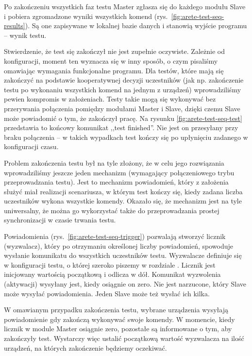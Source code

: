 \documentclass[00-praca-magisterska.tex]{subfiles}
\begin{document}
Po zakończeniu wszystkich faz testu Master zgłasza się do każdego modułu Slave
i pobiera zgromadzone wyniki wszystkich komend
(rys.~\ref{fig:arete-test-seq-results}). Są one zapisywane w lokalnej bazie
danych i stanowią wyjście programu -- wynik testu.

Stwierdzenie, że test się zakończył nie jest zupełnie oczywiste. Zależnie od
konfiguracji, moment ten wyznacza się w inny sposób, o czym pisaliśmy omawiając
wymagania funkcjonalne programu. Dla testów, które mają się zakończyć na
podstawie kooperatywnej decyzji uczestników (jak np. zakończenie testu po
wykonaniu wszystkich komend na jednym z urządzeń) wprowadziliśmy pewien
kompromis w założeniach. Testy takie mogą się wykonywać bez przerywania
połączenia pomiędzy modułami Master i Slave, dzięki czemu Slave może powiadomić
o tym, że zakończył pracę. Na rysunku \ref{fig:arete-test-seq-test} przedstawia
to końcowy komunikat ,,test finished''. Nie jest on przesyłany przy braku
połączenia -- w takich wypadkach test kończy się po upłynięciu zadanego w
konfiguracji czasu.

Problem zakończenia testu był na tyle złożony, że w celu jego rozwiązania
wprowadziliśmy jeszcze jeden mechanizm (wymagający połączeniowego trybu
przeprowadzania testu). Jest to mechanizm powiadomień, który z założenia służyć
miał realizacji scenariusza, w którym test kończy się, kiedy zadana liczba
uczestników wykona wszystkie komendy. Okazało się, że mechanizm jest na tyle
uniwersalny, że można go wykorzystać także do przeprowadzania prostej
synchronizacji w czasie trwania testu.

Powiadomienia (rys.~\ref{fig:arete-test-seq-trigger}) pozwalają stworzyć
licznik (wyzwalacz), który po otrzymaniu określonej liczby powiadomień,
spowoduje wysłanie komunikatu do wszystkich uczestników testu. Wyzwalacze
definiuje się w konfiguracji testu, o której szeroko piszemy w rozdziale
. Licznik jest inicjowany wartością początkową i odlicza w
dół. Komunikat wyzwolenia (aktywacji) wysyłany jest, kiedy osiągnie on zero.
Nie jest narzucone, który Slave może wysyłać powiadomienia. Jeden Slave może
też wysłać ich kilka.

W omawianym przypadku zakończenia testu, wybrane urządzenia wysyłają
powiadomienie gdy zakończą wykonywać swoje komendy. W momencie, kiedy licznik w
module Master osiągnie zero, pozostałe są informowane o tym, aby zakończyły
test. Wystarczy więc ustalić początkową wartość wyzwalacza na ilość urządzeń,
na których zakończenie będziemy oczekiwać.
\end{document}
